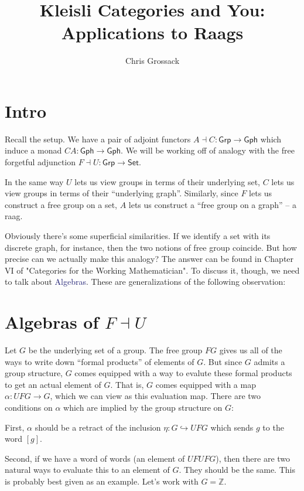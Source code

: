 \documentclass[12pt]{article}
\author{Chris Grossack}
\title{Kleisli Categories and You: Applications to Raags}
\theoremstyle{definition}
\newcommand*{\catFont}[1]{\mathsf{#1}}
\newcommand{\Set}{\catFont{Set}}
\newcommand{\Grp}{\catFont{Grp}}
\newcommand{\Gph}{\catFont{Gph}}
\newcommand*{\important}[1]{\textcolor{MidnightBlue}{#1}}
\begin{document}
\maketitle

\section{Intro}
  

Recall the setup. We have a pair of adjoint functors
$A \dashv C : \Grp \to \Gph$
which induce a monad $CA : \Gph \to \Gph$.
We will be working off of analogy with the free forgetful
adjunction $F \dashv U : \Grp \to \Set$. 

In the same way $U$ lets us view groups in terms of their underlying set,
$C$ lets us view groups in terms of their ``underlying graph''. Similarly,
since $F$ lets us construct a free group on a set, $A$ lets us construct
a ``free group on a graph'' -- a raag.

Obviously there's some superficial similarities. If we identify
a set with its discrete graph, for instance, then the two notions of
free group coincide. But how precise can we actually make this analogy?
The answer can be found in Chapter VI of "Categories for the Working Mathematician".
To discuss it, though, we need to talk about \important{Algebras}. 
These are generalizations of the following observation:

\section{Algebras of $F \dashv U$}

Let $G$ be the underlying set of a group. The free group $FG$ gives us
all of the ways to write down ``formal products'' of elements of $G$. 
But since $G$ admits a group structure, $G$ comes equipped with a way to
evalute these formal products to get an actual element of $G$. That is,
$G$ comes equipped with a map $\alpha : UFG \to G$, which we can view as
this evaluation map. There are two conditions on $\alpha$ which are implied
by the group structure on $G$:

First, $\alpha$ should be a retract of the inclusion $\eta : G \hookrightarrow UFG$ which sends $g$ to the word $[g]$. 

Second, if we have a word of words (an element of $UFUFG$), then there are two 
natural ways to evaluate this to an element of $G$. They should be the same.
This is probably best given as an example. Let's work with $G = \mathbb{Z}$.
\end{document}
